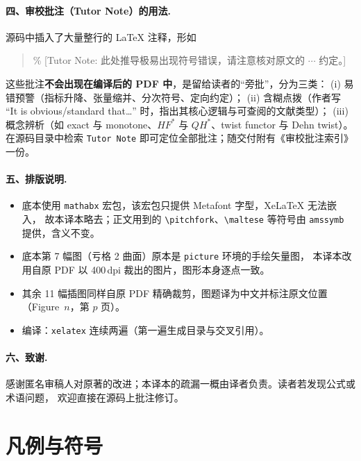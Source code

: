 \documentclass[11pt,a4paper]{article}
\numberwithin{equation}{section}
\begin{document}
\paragraph{四、审校批注（Tutor Note）的用法.}
源码中插入了大量整行的 LaTeX 注释，形如
\begin{quote}\ttfamily
\% [Tutor Note: 此处推导极易出现符号错误，请注意核对原文的 $\cdots$ 约定。]
\end{quote}
这些批注\textbf{不会出现在编译后的 PDF 中}，是留给读者的“旁批”，分为三类：
(i) 易错预警（指标升降、张量缩并、分次符号、定向约定）；
(ii) 含糊点拨（作者写 “It is obvious/standard that\dots” 时，指出其核心逻辑与可查阅的文献类型）；
(iii) 概念辨析（如 exact 与 monotone、$HF^*$ 与 $QH^*$、twist functor 与 Dehn twist）。
在源码目录中检索 \texttt{Tutor Note} 即可定位全部批注；随交付附有《审校批注索引》一份。

\paragraph{五、排版说明.}
\begin{itemize}
  \item 底本使用 \texttt{mathabx} 宏包，该宏包只提供 Metafont 字型，XeLaTeX 无法嵌入，
        故本译本略去；正文用到的 \texttt{\textbackslash pitchfork}、\texttt{\textbackslash maltese}
        等符号由 \texttt{amssymb} 提供，含义不变。
  \item 底本第 7 幅图（亏格 2 曲面）原本是 \texttt{picture} 环境的手绘矢量图，
        本译本改用自原 PDF 以 400\,dpi 裁出的图片，图形本身逐点一致。
  \item 其余 11 幅插图同样自原 PDF 精确裁剪，图题译为中文并标注原文位置（Figure~$n$，第 $p$ 页）。
  \item 编译：\texttt{xelatex} 连续两遍（第一遍生成目录与交叉引用）。
\end{itemize}

\paragraph{六、致谢.}
感谢匿名审稿人对原著的改进；本译本的疏漏一概由译者负责。读者若发现公式或术语问题，
欢迎直接在源码上批注修订。

\clearpage

\section*{凡例与符号}
\end{document}
